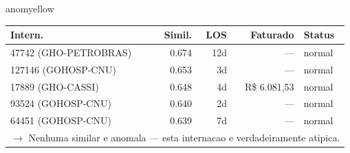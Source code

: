 \documentclass[a4paper,10pt]{article}
\begin{document}
\begin{anomalycard}[Internacao 10008 | GHO-PETROBRAS | MODERADO (z=2.07)]{anomyellow}
\begin{tabular}{l r r r l}\toprule\textbf{Intern.} & \textbf{Simil.} & \textbf{LOS} & \textbf{Faturado} & \textbf{Status} \\\midrule
47742 (GHO-PETROBRAS) & 0.674 & 12d & --- & \textcolor{jcubeblue}{normal} \\
127146 (GOHOSP-CNU) & 0.653 & 3d & --- & \textcolor{jcubeblue}{normal} \\
17889 (GHO-CASSI) & 0.648 & 4d & R\$ 6.081,53 & \textcolor{jcubeblue}{normal} \\
93524 (GOHOSP-CNU) & 0.640 & 2d & --- & \textcolor{jcubeblue}{normal} \\
64451 (GOHOSP-CNU) & 0.639 & 7d & --- & \textcolor{jcubeblue}{normal} \\
\multicolumn{5}{l}{\textcolor{jcubeblue}{\small $\rightarrow$ Nenhuma similar e anomala --- esta internacao e verdadeiramente atipica.}} \\
\bottomrule\end{tabular}


\end{anomalycard}

\newpage
\end{document}

